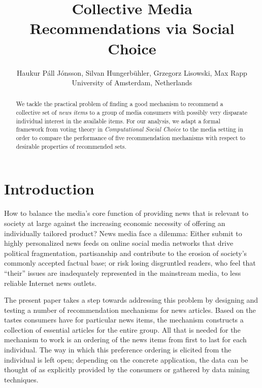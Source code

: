 \documentclass{article}
\title{Collective Media Recommendations via Social Choice \vspace{-2ex}
}
\author{
    Haukur P{\'a}ll J{\'o}nsson, %
    Silvan Hungerb{\"u}hler, %
    Grzegorz Lisowski, %
    Max Rapp
    \\ University of Amsterdam, Netherlands
   \vspace{-2ex}
}
\begin{document}
\maketitle
\begin{abstract}
We tackle the practical problem of finding a good mechanism to recommend a collective set of {\em news items} to a group of media consumers with possibly very disparate individual interest in the available items. For our analysis, we adapt a formal framework from voting theory in {\em Computational Social Choice} to the media setting in order to compare the performance of five recommendation mechanisms with respect to desirable properties of recommended sets.
\end{abstract}

\section{Introduction}\label{introduction}

How to balance the media's core function of providing news that is relevant to society at large against the increasing economic necessity of offering an individually tailored product?
News media face a dilemma: Either submit to highly personalized news feeds on online social media networks that drive political
fragmentation, partisanship and contribute to the erosion of society's commonly accepted factual base; or risk losing disgruntled readers, who feel that ``their'' issues are inadequately represented in the mainstream media, to less reliable Internet news outlets.



The present paper takes a step towards addressing this problem by designing and testing a number of recommendation mechanisms for news articles.
 Based on the tastes consumers have for particular news items, the mechanism constructs a collection of essential articles for the entire group.
 All that is needed for the mechanism to work is an ordering of the news items from first to last for each individual.
 The way in which this preference ordering is elicited from the individual is left open;
 depending on the concrete application, the data can be thought of as explicitly provided by the consumers or gathered by data mining techniques.
\end{document}
